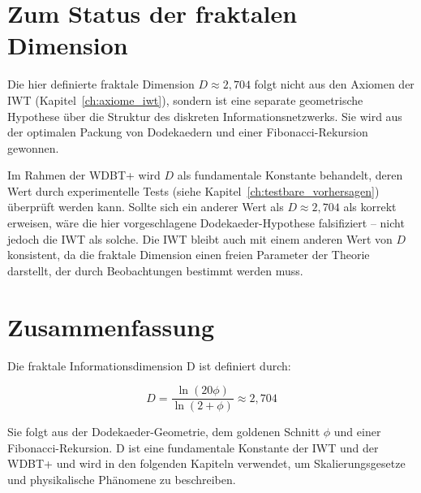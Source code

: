 \section{Zum Status der fraktalen Dimension}
\label{sec:d_status}

Die hier definierte fraktale Dimension \( D \approx 2,704 \) folgt nicht aus den Axiomen der IWT (Kapitel~\ref{ch:axiome_iwt}), sondern ist eine separate geometrische Hypothese über die Struktur des diskreten Informationsnetzwerks. Sie wird aus der optimalen Packung von Dodekaedern und einer Fibonacci-Rekursion gewonnen.

Im Rahmen der WDBT+ wird \( D \) als fundamentale Konstante behandelt, deren Wert durch experimentelle Tests (siehe Kapitel~\ref{ch:testbare_vorhersagen}) überprüft werden kann. Sollte sich ein anderer Wert als \( D \approx 2,704 \) als korrekt erweisen, wäre die hier vorgeschlagene Dodekaeder-Hypothese falsifiziert – nicht jedoch die IWT als solche. Die IWT bleibt auch mit einem anderen Wert von \( D \) konsistent, da die fraktale Dimension einen freien Parameter der Theorie darstellt, der durch Beobachtungen bestimmt werden muss.

\section{Zusammenfassung}
\label{sec:d_zusammenfassung}

Die fraktale Informationsdimension D ist definiert durch:

\[
D = \frac{\ln(20\phi)}{\ln(2 + \phi)} \approx 2,704
\]

Sie folgt aus der Dodekaeder-Geometrie, dem goldenen Schnitt \( \phi \) und einer Fibonacci-Rekursion. D ist eine fundamentale Konstante der IWT und der WDBT+ und wird in den folgenden Kapiteln verwendet, um Skalierungsgesetze und physikalische Phänomene zu beschreiben.
